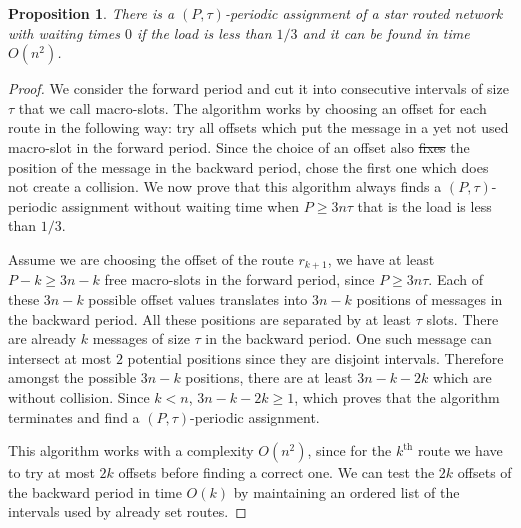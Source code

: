 \documentclass[10pt, conference, letterpaper]{IEEEtran}
\newtheorem{proposition}{Proposition}
\providecommand{\DIFaddtex}[1]{{\protect\color{blue}\uwave{#1}}} %
\providecommand{\DIFdeltex}[1]{{\protect\color{red}\sout{#1}}}                      %
\providecommand{\DIFaddbegin}{} %
\providecommand{\DIFaddend}{} %
\providecommand{\DIFdelbegin}{} %
\providecommand{\DIFdelend}{} %
\providecommand{\DIFadd}[1]{\texorpdfstring{\DIFaddtex{#1}}{#1}} %
\providecommand{\DIFdel}[1]{\texorpdfstring{\DIFdeltex{#1}}{}} %
\newcommand{\DIFscaledelfig}{0.5}
\newlength{\DIFdelgraphicswidth} %
\newlength{\DIFdelgraphicsheight} %
\newcommand{\DIFaddincludegraphics}[2][]{{\color{blue}\fbox{\DIFOincludegraphics[#1]{#2}}}} %
\newcommand{\DIFdelincludegraphics}[2][]{%
\sbox{\DIFdelgraphicsbox}{\DIFOincludegraphics[#1]{#2}}%
\settoboxwidth{\DIFdelgraphicswidth}{\DIFdelgraphicsbox} %
\settoboxtotalheight{\DIFdelgraphicsheight}{\DIFdelgraphicsbox} %
\scalebox{\DIFscaledelfig}{%
\parbox[b]{\DIFdelgraphicswidth}{\usebox{\DIFdelgraphicsbox}\\[-\baselineskip] \rule{\DIFdelgraphicswidth}{0em}}\llap{\resizebox{\DIFdelgraphicswidth}{\DIFdelgraphicsheight}{%
\setlength{\unitlength}{\DIFdelgraphicswidth}%
\begin{picture}(1,1)%
\thicklines\linethickness{2pt} %
{\color[rgb]{1,0,0}\put(0,0){\framebox(1,1){}}}%
{\color[rgb]{1,0,0}\put(0,0){\line( 1,1){1}}}%
{\color[rgb]{1,0,0}\put(0,1){\line(1,-1){1}}}%
\end{picture}%
}\hspace*{3pt}}} %
} %
\DeclareRobustCommand{\DIFaddbegin}{\DIFOaddbegin \let\includegraphics\DIFaddincludegraphics} %
\DeclareRobustCommand{\DIFaddend}{\DIFOaddend \let\includegraphics\DIFOincludegraphics} %
\DeclareRobustCommand{\DIFdelbegin}{\DIFOdelbegin \let\includegraphics\DIFdelincludegraphics} %
\DeclareRobustCommand{\DIFdelend}{\DIFOaddend \let\includegraphics\DIFOincludegraphics} %
\begin{document}
    \begin{proposition}
    There is a $(P,\tau)$-periodic assignment of a star routed network with waiting times $0$ if the load is less than $1/3$ and it can be found in time $O(n^2)$.
    \end{proposition}
    \begin{proof}
     We consider the forward period and cut it into consecutive intervals of size $\tau$ that we call macro-slots. The algorithm works by choosing an offset for each route in the following way: try all offsets which put the message in a yet not used macro-slot in the forward
     period. Since the choice of an offset also \DIFdelbegin \DIFdel{fixes }\DIFdelend \DIFaddbegin \DIFadd{sets }\DIFaddend the position of the message in the backward period, chose the first one which does not create a collision. We now prove that this algorithm always finds a $(P,\tau)$-periodic assignment without waiting time when $P \geq 3n\tau$ that is the load is less than $1/3$.

     Assume we are choosing the offset of the route $r_{k+1}$, we have at least $P - k \geq 3n - k$ free macro-slots in the forward period, since $P \geq 3n\tau$. Each of these $3n - k$ possible offset values translates into $3n - k$ positions of messages in the backward period. All these positions are separated by at least $\tau$ slots. There are already $k$ messages of size $\tau$ in the backward period. One such message can intersect at most $2$ potential positions since they are disjoint intervals. Therefore  amongst the possible $3n - k$ positions, there are  at least $3n - k -2k$ which are without collision. Since $k < n$, $3n - k -2k \geq 1$, which proves that the algorithm terminates and find a  $(P,\tau)$-periodic assignment. 

     This algorithm works with a complexity $O(n^2)$, since for the $k^{\text{th}}$ route we have to try at most $2k$ offsets before finding a correct one. We can test the $2k$ offsets of the backward period in time $O(k)$ by maintaining an ordered list of the intervals used by already set routes.
     \end{proof}
     \DIFdelbegin %
\end{document}

